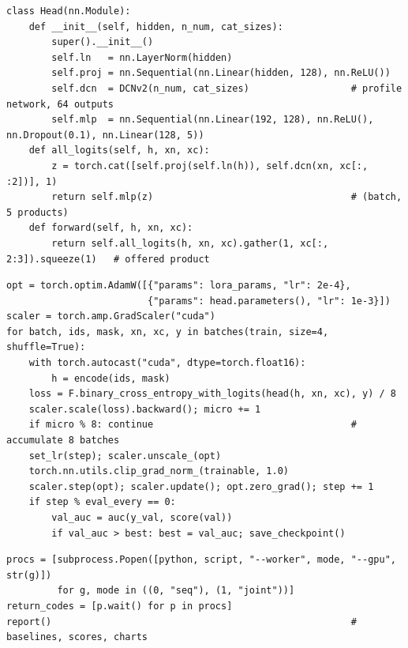 \documentclass[10pt,a4paper]{article}
\begin{document}
\begin{lstlisting}[caption={The fusion head: one score per product; training uses the offered product's score.}]
class Head(nn.Module):
    def __init__(self, hidden, n_num, cat_sizes):
        super().__init__()
        self.ln   = nn.LayerNorm(hidden)
        self.proj = nn.Sequential(nn.Linear(hidden, 128), nn.ReLU())
        self.dcn  = DCNv2(n_num, cat_sizes)                  # profile network, 64 outputs
        self.mlp  = nn.Sequential(nn.Linear(192, 128), nn.ReLU(), nn.Dropout(0.1), nn.Linear(128, 5))
    def all_logits(self, h, xn, xc):
        z = torch.cat([self.proj(self.ln(h)), self.dcn(xn, xc[:, :2])], 1)
        return self.mlp(z)                                   # (batch, 5 products)
    def forward(self, h, xn, xc):
        return self.all_logits(h, xn, xc).gather(1, xc[:, 2:3]).squeeze(1)   # offered product
\end{lstlisting}

\begin{lstlisting}[caption={Training loop: mixed precision, gradient accumulation, clipping, and keeping the best checkpoint.}]
opt = torch.optim.AdamW([{"params": lora_params, "lr": 2e-4},
                         {"params": head.parameters(), "lr": 1e-3}])
scaler = torch.amp.GradScaler("cuda")
for batch, ids, mask, xn, xc, y in batches(train, size=4, shuffle=True):
    with torch.autocast("cuda", dtype=torch.float16):
        h = encode(ids, mask)
    loss = F.binary_cross_entropy_with_logits(head(h, xn, xc), y) / 8
    scaler.scale(loss).backward(); micro += 1
    if micro % 8: continue                                   # accumulate 8 batches
    set_lr(step); scaler.unscale_(opt)
    torch.nn.utils.clip_grad_norm_(trainable, 1.0)
    scaler.step(opt); scaler.update(); opt.zero_grad(); step += 1
    if step % eval_every == 0:
        val_auc = auc(y_val, score(val))
        if val_auc > best: best = val_auc; save_checkpoint()
\end{lstlisting}

\begin{lstlisting}[caption={Running the two fine-tuning jobs in parallel, one per GPU.}]
procs = [subprocess.Popen([python, script, "--worker", mode, "--gpu", str(g)])
         for g, mode in ((0, "seq"), (1, "joint"))]
return_codes = [p.wait() for p in procs]
report()                                                     # baselines, scores, charts
\end{lstlisting}

\end{document}
